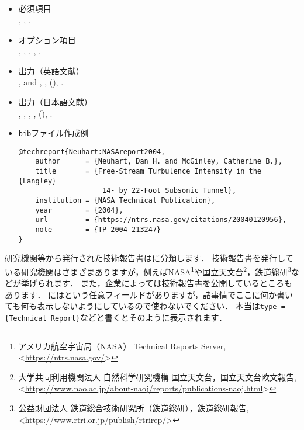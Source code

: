 \documentclass[a4paper,fleqn,uplatex,dvipdfmx]{jsarticle}
\begin{document}
\subsection{\tttechreport}
\label{ssec:techreport}
\begin{screen}
    \begin{itemize}
        \item 必須項目 \\
        \ttauthor, \tttitle, \ttinstitution, \ttyear
        \item オプション項目 \\
        \tttype, \ttnumber, \ttaddress, \ttmonth, \ttnote, \ttkey
        \item 出力（英語文献） \\
            \colorbox[gray]{0.8}{\ttauthorf}, \colorbox[gray]{0.8}{\ttauthors} and \colorbox[gray]{0.8}{\ttauthort}, \colorbox[gray]{0.8}{\tttitle}, \colorbox[gray]{0.8}{\ttinstitution} (\colorbox[gray]{0.8}{\ttyear}), \colorbox[gray]{0.8}{\ttnote}.
        \item 出力（日本語文献） \\
            \colorbox[gray]{0.8}{\ttauthorf}, \colorbox[gray]{0.8}{\ttauthors}, \colorbox[gray]{0.8}{\ttauthort}, \colorbox[gray]{0.8}{\tttitle}, \colorbox[gray]{0.8}{\ttinstitution} (\colorbox[gray]{0.8}{\ttyear}), \colorbox[gray]{0.8}{\ttnote}.
        \item \verb|bib|ファイル作成例 \vspace{-3mm}
\begin{verbatim}
@techreport{Neuhart:NASAreport2004,
    author      = {Neuhart, Dan H. and McGinley, Catherine B.},
    title       = {Free-Stream Turbulence Intensity in the {Langley} 
                    14- by 22-Foot Subsonic Tunnel},
    institution = {NASA Technical Publication},
    year        = {2004},
    url         = {https://ntrs.nasa.gov/citations/20040120956},
    note        = {TP-2004-213247}
}
\end{verbatim}
    \end{itemize}
\end{screen}

研究機関等から発行された技術報告書は\tttechreport に分類します．
技術報告書を発行している研究機関はさまざまありますが，例えばNASA\footnote{アメリカ航空宇宙局（NASA） Technical Reports Server, \textless\url{https://ntrs.nasa.gov/}\textgreater}や国立天文台\footnote{大学共同利用機関法人 自然科学研究機構 国立天文台，国立天文台欧文報告, \textless\url{https://www.nao.ac.jp/about-naoj/reports/publications-naoj.html}\textgreater}，鉄道総研\footnote{公益財団法人 鉄道総合技術研究所（鉄道総研），鉄道総研報告, \textless\url{https://www.rtri.or.jp/publish/rtrirep/}\textgreater}などが挙げられます．
また，企業によっては技術報告書を公開しているところもあります．
\tttechreport には\tttype という任意フィールドがありますが，諸事情でここに何か書いても何も表示しないようにしているので使わないでください．
本当は\verb|type = {Technical Report}|などと書くとそのように表示されます．
\end{document}
